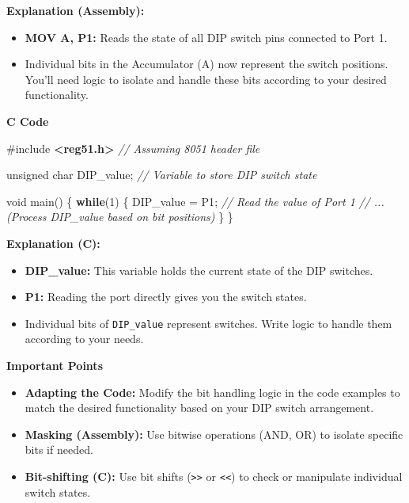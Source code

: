 \documentclass[
]{article}
\newenvironment{Shaded}{}{}
\newcommand{\CommentTok}[1]{\textcolor[rgb]{0.38,0.63,0.69}{\textit{#1}}}
\newcommand{\ControlFlowTok}[1]{\textcolor[rgb]{0.00,0.44,0.13}{\textbf{#1}}}
\newcommand{\DataTypeTok}[1]{\textcolor[rgb]{0.56,0.13,0.00}{#1}}
\newcommand{\DecValTok}[1]{\textcolor[rgb]{0.25,0.63,0.44}{#1}}
\newcommand{\ImportTok}[1]{\textcolor[rgb]{0.00,0.50,0.00}{\textbf{#1}}}
\newcommand{\NormalTok}[1]{#1}
\newcommand{\OperatorTok}[1]{\textcolor[rgb]{0.40,0.40,0.40}{#1}}
\newcommand{\PreprocessorTok}[1]{\textcolor[rgb]{0.74,0.48,0.00}{#1}}
\begin{document}
\textbf{Explanation (Assembly):}

\begin{itemize}
\item
  \textbf{MOV A, P1:} Reads the state of all DIP switch pins connected
  to Port 1.
\item
  Individual bits in the Accumulator (A) now represent the switch
  positions. You'll need logic to isolate and handle these bits
  according to your desired functionality.
\end{itemize}

\textbf{C Code}

\begin{Shaded}
\begin{Highlighting}[]
\PreprocessorTok{\#include }\ImportTok{\textless{}reg51.h\textgreater{}}\PreprocessorTok{ }\CommentTok{// Assuming 8051 header file}

\DataTypeTok{unsigned} \DataTypeTok{char}\NormalTok{ DIP\_value}\OperatorTok{;} \CommentTok{// Variable to store DIP switch state}

\DataTypeTok{void}\NormalTok{ main}\OperatorTok{()} \OperatorTok{\{}
    \ControlFlowTok{while}\OperatorTok{(}\DecValTok{1}\OperatorTok{)} \OperatorTok{\{}
\NormalTok{        DIP\_value }\OperatorTok{=}\NormalTok{ P1}\OperatorTok{;} \CommentTok{// Read the value of Port 1}
        \CommentTok{// ... (Process DIP\_value based on bit positions)}
    \OperatorTok{\}}
\OperatorTok{\}}
\end{Highlighting}
\end{Shaded}

\textbf{Explanation (C):}

\begin{itemize}
\item
  \textbf{DIP\_value:} This variable holds the current state of the DIP
  switches.
\item
  \textbf{P1:} Reading the port directly gives you the switch states.
\item
  Individual bits of \texttt{DIP\_value} represent switches. Write logic
  to handle them according to your needs.
\end{itemize}

\textbf{Important Points}

\begin{itemize}
\item
  \textbf{Adapting the Code:} Modify the bit handling logic in the code
  examples to match the desired functionality based on your DIP switch
  arrangement.
\item
  \textbf{Masking (Assembly):} Use bitwise operations (AND, OR) to
  isolate specific bits if needed.
\item
  \textbf{Bit-shifting (C):} Use bit shifts
  (\texttt{\textgreater{}\textgreater{}} or
  \texttt{\textless{}\textless{}}) to check or manipulate individual
  switch states.
\end{itemize}
\end{document}
